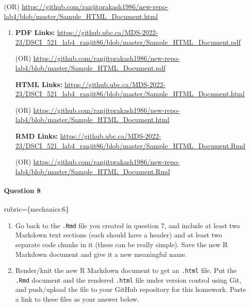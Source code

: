 \documentclass[
]{article}
\begin{document}
(OR)
\url{https://github.com/ranjitprakash1986/new-repo-lab4/blob/master/Sample_HTML_Document.html}

\begin{enumerate}
\def\labelenumi{\arabic{enumi}.}
\setcounter{enumi}{1}
\item
  \textbf{PDF Links:}
  \url{https://github.ubc.ca/MDS-2022-23/DSCI_521_lab4_ranjit86/blob/master/Sample_HTML_Document.pdf}

  (OR)
  \url{https://github.com/ranjitprakash1986/new-repo-lab4/blob/master/Sample_HTML_Document.pdf}

  \textbf{HTML Links:}
  \url{https://github.ubc.ca/MDS-2022-23/DSCI_521_lab4_ranjit86/blob/master/Sample_HTML_Document.html}

  (OR)
  \url{https://github.com/ranjitprakash1986/new-repo-lab4/blob/master/Sample_HTML_Document.html}

  \textbf{RMD Links:}
  \url{https://github.ubc.ca/MDS-2022-23/DSCI_521_lab4_ranjit86/blob/master/Sample_HTML_Document.Rmd}

  (OR)
  \url{https://github.com/ranjitprakash1986/new-repo-lab4/blob/master/Sample_HTML_Document.Rmd}
\end{enumerate}

\begin{alert alert-info}
\hypertarget{question-8}{%
\paragraph{Question 8}\label{question-8}}

rubric=\{mechanics:6\}

\begin{enumerate}
\def\labelenumi{\arabic{enumi}.}
\item
  Go back to the \texttt{.Rmd} file you created in question 7, and
  include at least two Markdown text sections (each should have a
  header) and at least two separate code chunks in it (these can be
  really simple). Save the new R Markdown document and give it a new
  meaningful name.
\item
  Render/knit the new R Markdown document to get an \texttt{.html} file.
  Put the \texttt{.Rmd} document and the rendered \texttt{.html} file
  under version control using Git, and push/upload the file to your
  GitHub repository for this homework. Paste a link to these files as
  your answer below.
\end{enumerate}
\end{alert alert-info}
\end{document}
